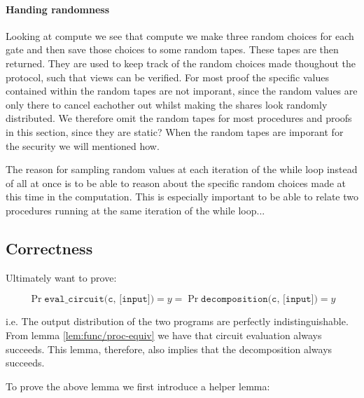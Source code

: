 \paragraph{Handing randomness}
\label{subsec:decomp:randomness}
Looking at compute we see that compute we make three random choices for each gate and then save those choices to some random tapes. These tapes are then returned. They are used to keep track of the random choices made thoughout the protocol, such that views can be verified. For most proof the specific values contained within the random tapes are not imporant, since the random values are only there to cancel eachother out whilst making the shares look randomly distributed.
We therefore omit the random tapes for most procedures and proofs in this section, since they are static?
When the random tapes are imporant for the security we will mentioned how.

The reason for sampling random values at each iteration of the while loop
instead of all at once is to be able to reason about the specific random choices
made at this time in the computation. This is especially important to be able to
relate two procedures running at the same iteration of the while loop...


\subsection{Correctness}
\label{sec:decomp_correct}
Ultimately want to prove:
\begin{lemma}
  \label{lem:decomposition_correctness}

  \[
    \Pr{\texttt{eval\_circuit(c, [input])} = y} =
    \Pr{\texttt{decomposition(c, [input])} = y}
  \]

  i.e. The output distribution of the two programs are perfectly indistinguishable. From lemma \ref{lem:func/proc-equiv} we have that circuit evaluation always succeeds. This lemma, therefore, also implies that the decomposition always succeeds.
\end{lemma}

To prove the above lemma we first introduce a helper lemma:

